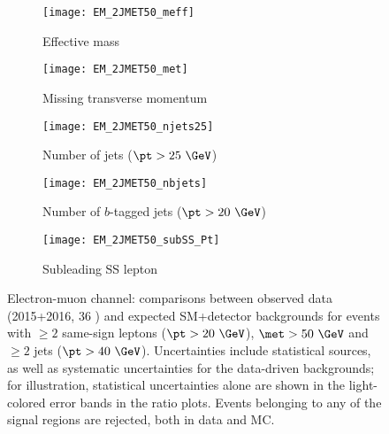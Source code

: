 \begin{figure}[t!]
\centering
\begin{subfigure}[t]{0.48\textwidth}
\texttt{[image: EM\_2JMET50\_meff]}
\caption{Effective mass \meff}
\end{subfigure}
\begin{subfigure}[t]{0.48\textwidth}
\texttt{[image: EM\_2JMET50\_met]}
\caption{Missing transverse momentum \met}
\end{subfigure}
\begin{subfigure}[t]{0.48\textwidth}
\texttt{[image: EM\_2JMET50\_njets25]}
\caption{Number of jets ($\pt>25~\GeV$)}
\end{subfigure}
\begin{subfigure}[t]{0.48\textwidth}
\texttt{[image: EM\_2JMET50\_nbjets]}
\caption{Number of $b$-tagged jets ($\pt>20~\GeV$)}
\end{subfigure}
\begin{subfigure}[t]{0.48\textwidth}
\texttt{[image: EM\_2JMET50\_subSS\_Pt]}
\caption{Subleading SS lepton \pt}
\end{subfigure}
\caption{Electron-muon channel: comparisons between observed data (2015+2016, 36 \ifb) and expected SM+detector backgrounds 
for events with $\ge 2$ same-sign leptons ($\pt>20~\GeV$), $\met>50~\GeV$ and $\ge 2$ jets ($\pt>40~\GeV$). 
Uncertainties include statistical sources, as well as systematic uncertainties for the data-driven backgrounds; 
for illustration, statistical uncertainties alone are shown in the light-colored error bands in the ratio plots. 
Events belonging to any of the signal regions are rejected, both in data and MC.  
}
\label{fig:distributions_channelEM_2015}
\end{figure} 

